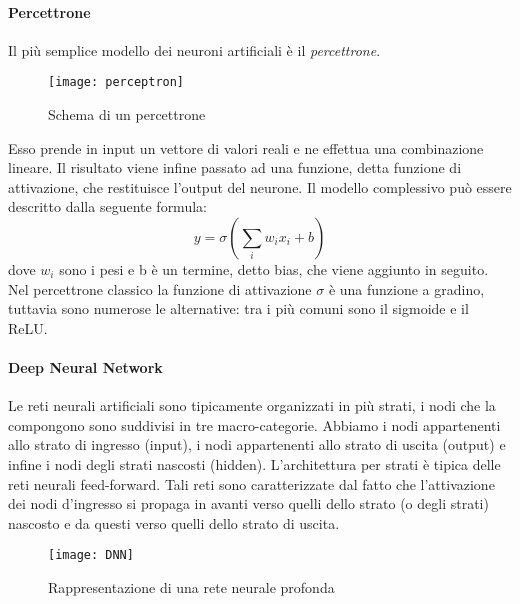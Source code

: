 \paragraph{Percettrone}
Il più semplice modello dei neuroni artificiali è il \textit{percettrone}. 
\begin{figure}[ht]
    \centering
    \texttt{[image: perceptron]}
    \caption[Percettrone]{Schema di un percettrone \cite{pythonmachinelearning}}
\end{figure}
Esso prende in input un vettore di valori reali e ne effettua una combinazione lineare. Il risultato viene infine passato ad una funzione, detta funzione di attivazione, che restituisce l'output del neurone. Il modello complessivo può essere descritto dalla seguente formula: 
$$y=\sigma(\sum_{i} w_{i}x_{i}+b)$$
dove $w_{i}$ sono i pesi e b è un termine, detto bias, che viene aggiunto in seguito. Nel percettrone classico la funzione di attivazione $\sigma$ è una funzione a gradino, tuttavia sono numerose le alternative: tra i più comuni sono il sigmoide e il ReLU.
\paragraph{Deep Neural Network} 
Le reti neurali artificiali sono tipicamente organizzati in più strati, i nodi che la compongono sono suddivisi in tre macro-categorie. Abbiamo i nodi appartenenti allo strato di ingresso (input), i nodi appartenenti allo strato di uscita (output) e infine i nodi degli strati nascosti (hidden). L’architettura per strati è tipica delle reti neurali feed-forward. Tali reti sono caratterizzate dal fatto che l’attivazione dei nodi d’ingresso si propaga in avanti verso quelli dello strato (o degli strati) nascosto e da questi verso quelli dello strato di uscita.
\begin{figure}[ht]
    \centering
    \texttt{[image: DNN]}
    \caption[Deep Neural Network]{Rappresentazione di una rete neurale profonda \cite{ann}}
\end{figure}

